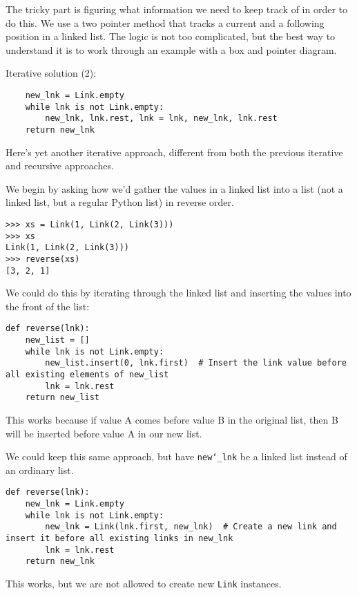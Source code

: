 \begin{solution}[1.2in]
The tricky part is figuring what information we need to keep track of in order
to do this. We use a two pointer method that tracks a current and a following
position in a linked list. The logic is not too complicated, but the best way to
understand it is to work through an example with a box and pointer diagram.

{\Large Iterative solution (2):}
\begin{lstlisting}
    new_lnk = Link.empty
    while lnk is not Link.empty:
        new_lnk, lnk.rest, lnk = lnk, new_lnk, lnk.rest
    return new_lnk
\end{lstlisting}

Here's yet another iterative approach, different from both the previous
iterative and recursive approaches.

We begin by asking how we'd gather the values in a linked list into a list (not
a linked list, but a regular Python list) in reverse order.

\begin{lstlisting}
>>> xs = Link(1, Link(2, Link(3)))
>>> xs
Link(1, Link(2, Link(3)))
>>> reverse(xs)
[3, 2, 1]
\end{lstlisting}

We could do this by iterating through the linked list and inserting the values
into the front of the list:

\begin{lstlisting}
def reverse(lnk):
    new_list = []
    while lnk is not Link.empty:
        new_list.insert(0, lnk.first)  # Insert the link value before all existing elements of new_list
        lnk = lnk.rest
    return new_list
\end{lstlisting}

This works because if value A comes before value B in the original list, then B
will be inserted before value A in our new list.

We could keep this same approach, but have \texttt{new\char`_lnk} be a linked
list instead of an ordinary list.

\begin{lstlisting}
def reverse(lnk):
    new_lnk = Link.empty
    while lnk is not Link.empty:
        new_lnk = Link(lnk.first, new_lnk)  # Create a new link and insert it before all existing links in new_lnk
        lnk = lnk.rest
    return new_lnk
\end{lstlisting}

This works, but we are not allowed to create new \texttt{Link} instances.


\end{solution}
